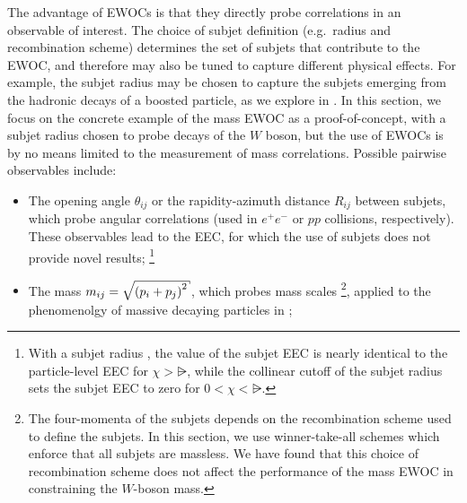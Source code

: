 The advantage of EWOCs is that they directly probe correlations in an observable of interest.
%
The choice of subjet definition (e.g.~radius and recombination scheme) determines the set of subjets that contribute to the EWOC, and therefore may also be tuned to capture different physical effects.
%
For example, the subjet radius may be chosen to capture the subjets emerging from the hadronic decays of a boosted particle, as we explore in .
%
In this section, we focus on the concrete example of the mass EWOC as a proof-of-concept, with a subjet radius chosen to probe decays of the \(W\) boson, but the use of EWOCs is by no means limited to the measurement of mass correlations.
%
Possible pairwise observables include:
\begin{itemize}
    \item
        The opening angle \(\theta_{ij}\) or the rapidity-azimuth distance \(R_{ij}\) between subjets, which probe angular correlations (used in $e^+e^-$ or $pp$ collisions, respectively).
        These observables lead to the EEC, for which the use of subjets does not provide novel results;%
        \footnote{
            With a subjet radius \rsub{}, the value of the subjet EEC is nearly identical to the particle-level EEC for $\chi>\rsub$, while the collinear cutoff of the subjet radius sets the subjet EEC to zero for $0<\chi<\rsub$.
        }

    \item
        The mass \(m_{ij} = \sqrt{\le(p_i + p_j\ri)^2}\), which probes mass scales%
        \footnote{
            The four-momenta of the subjets depends on the recombination scheme used to define the subjets.
            In this section, we use winner-take-all schemes which enforce that all subjets are massless.
            We have found that this choice of recombination scheme does not affect the performance of the mass EWOC in constraining the $W$-boson mass.
        }, applied to the phenomenolgy of massive decaying particles in ;


\end{itemize}
